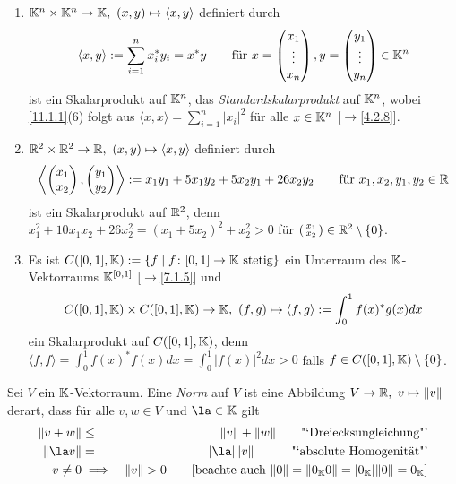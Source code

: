 \documentclass[../../main.tex]{subfiles}
\begin{document}
\begin{bsp}\label{11.1.3}
\begin{enumerate}[\normalfont(a)]
\item $\K^n\times\K^n\to\K,\ (x,y)\mapsto\langle x,y\rangle$ definiert durch
\[\langle x,y\rangle:=\sum_{i=1}^nx_i^*y_i=x^*y\qquad\text{für }x=\begin{pmatrix}x_1\\\vdots\\x_n\end{pmatrix},y=\begin{pmatrix}y_1\\\vdots\\y_n\end{pmatrix}\in\mathbb K^n\]
ist ein Skalarprodukt auf $\mathbb K^n$, das \emph{Standardskalarprodukt} auf $\mathbb K^n$, wobei \ref{11.1.1}(6) folgt aus
$\langle x,x\rangle=\sum_{i=1}^n|x_i|^2$ für alle $x\in\mathbb K^n$ [$\to$\ref{4.2.8}].
\item $\R^2\times\R^2\to\R,\ (x,y)\mapsto\langle x,y\rangle$ definiert durch
\[\left\langle\begin{pmatrix}x_1\\x_2\end{pmatrix},\begin{pmatrix}y_1\\y_2\end{pmatrix}\right\rangle:=x_1y_1+5x_1y_2+5x_2y_1+26x_2y_2\qquad\text{für }x_1,x_2,y_1,y_2\in\mathbb R\]
ist ein Skalarprodukt auf $\mathbb R^2$, denn
$x_1^2+10x_1x_2+26x_2^2=(x_1+5x_2)^2+x_2^2>0$ für $(\begin{smallmatrix}x_1\\x_2\end{smallmatrix})\in\mathbb R^2\setminus\{0\}$.
\item Es ist $C([0,1],\mathbb K):=\{f\mid f\colon[0,1]\to\mathbb K\ \text{stetig}\}$ ein Unterraum des $\mathbb K$-Vektorraums $\mathbb K^{[0,1]}$ [$\to$\ref{7.1.5}] und
\[C([0,1],\K)\times C([0,1],\K)\to\K,\ (f,g)\mapsto\langle f,g\rangle:=\int_0^1f(x)^*g(x)dx\]
ein Skalarprodukt auf $C([0,1],\mathbb K)$, denn $\langle f,f\rangle=\int_0^1f(x)^*f(x)dx=\int_0^1|f(x)|^2dx>0$ falls $f\in C([0,1],\mathbb K)\setminus\{0\}$.
\end{enumerate}
\end{bsp}

\begin{df}\label{11.1.4}
Sei $V$ ein $\mathbb K$-Vektorraum. Eine \emph{Norm} auf $V$ ist eine Abbildung $V\to\R,\ v\mapsto\|v\|$ derart, dass für alle $v,w\in V$ und $\la\in\K$ gilt
\begin{eqnarray*}
\|v+w\|&\le&\|v\|+\|w\|\qquad\text{"`Dreiecksungleichung"'}\\
\|\la v\|&=&|\la|\|v\|\quad\qquad\text{"`absolute Homogenität"'}\\
v\ne0&\implies&\|v\|>0\qquad\text{[beachte auch $\|0\|=\|0_\K0\|=|0_\K|\|0\|=0_\K$]}
\end{eqnarray*}
\end{df}
\end{document}
